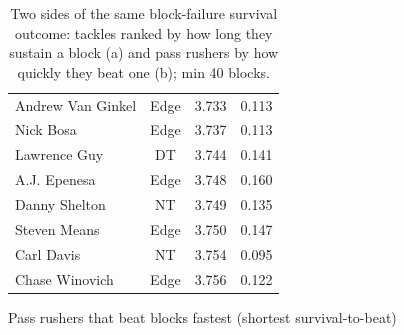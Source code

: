 \begin{table}[h!]
\begin{subtable}{0.48\textwidth}
\begin{tabular}{lccc}
Andrew Van Ginkel & Edge & 3.733 & 0.113 \\
Nick Bosa & Edge & 3.737 & 0.113 \\
Lawrence Guy & DT & 3.744 & 0.141 \\
A.J. Epenesa & Edge & 3.748 & 0.160 \\
Danny Shelton & NT & 3.749 & 0.135 \\
Steven Means & Edge & 3.750 & 0.147 \\
Carl Davis & NT & 3.754 & 0.095 \\
Chase Winovich & Edge & 3.756 & 0.122 \\
\bottomrule
\end{tabular}
\caption{Pass rushers that beat blocks fastest (shortest survival-to-beat)}
\label{tab:rusher_shedding}
\end{subtable}
\caption{Two sides of the same block-failure survival outcome: tackles ranked by how long they sustain a block (a) and pass rushers by how quickly they beat one (b); min 40 blocks.}
\label{tab:beat_rates}
\end{table}
